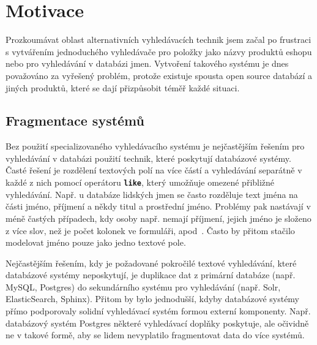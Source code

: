 \documentclass[11pt,letterpaper,oneside,openright]{book}
\newcommand{\bftt}[1]{\texttt{\textbf{#1}}}
\begin{document}

\section{Motivace}
Prozkoumávat oblast alternativních vyhledávacích technik jsem začal po
frustraci s vytvářením jednoduchého vyhledávače pro položky jako názvy produktů
eshopu nebo pro vyhledávání v databázi jmen. Vytvoření takového systému je dnes
považováno za vyřešený problém, protože existuje spousta open source databází a
jiných produktů, které se dají přizpůsobit téměř každé situaci.

\subsection{Fragmentace systémů}
Bez použití specializovaného vyhledávacího systému je nejčastějším řešením pro
vyhledávání v databázi použití technik, které poskytují databázové systémy.
Časté řešení je rozdělení textových polí na více částí a vyhledávání separátně
v každé z nich pomocí operátoru \bftt{like}, který umožňuje omezené přibližné
vyhledávání. Např. u databáze lidských jmen se často rozděluje text jména na části
jméno, příjmení a někdy titul a prostřední jméno. Problémy pak nastávají v méně
častých případech, kdy osoby např. nemají příjmení, jejich jméno je složeno z
více slov, než je počet kolonek ve formuláři, apod~\cite{name_falsehoods}.
Často by přitom stačilo modelovat jméno pouze jako jedno textové pole.

Nejčastějším řešením, kdy je požadované pokročilé textové vyhledávání, které
databázové systémy neposkytují, je duplikace dat z primární databáze (např.
MySQL, Postgres) do sekundárního systému pro vyhledávání (např. Solr,
ElasticSearch, Sphinx). Přitom by bylo jednodušší, kdyby databázové systémy
přímo podporovaly solidní vyhledávací systém formou externí komponenty. Např.
databázový systém Postgres některé vyhledávací doplňky poskytuje, ale očividně
ne v takové formě, aby se lidem nevyplatilo fragmentovat data do více systémů.
\end{document}
